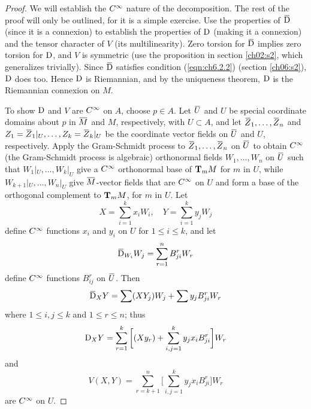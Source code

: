 \documentclass[../main]{subfiles}
\begin{document}
\begin{proof}
We will establish the $\CInfty$ nature of the decomposition. The rest of the proof will only be outlined, for it is a simple exercise. Use the properties of $\covariant$ (since it is a connexion) to establish the properties of $\D$ (making it a connexion) and the tensor character of $V$ (its multilinearity). Zero torsion for $\covariant$ implies zero torsion for $\D$, and $V$ is symmetric (use the proposition in section \ref{ch02:s2}, which generalizes trivially). Since $\covariant$ satisfies condition (\ref{eqn:ch6.2.2}) (section \ref{ch06:s2}), $\D$ does too. Hence $\D$ is Riemannian, and by the uniqueness theorem, $\D$ is the Riemannian connexion on $M$.

To show $\D$ and $V$ are $\CInfty$ on $A$, choose $p\in A$. Let $\xoverline U$ and $U$ be special coordinate domains about $p$ in $\xoverline M$ and $M$, respectively, with $U\subset A$, and let $\xoverline Z_1,\ldots,\xoverline Z_n$ and $Z_1=\xoverline Z_1|_U,\ldots,Z_k=\xoverline Z_k|_U$ be the coordinate vector fields on $\xoverline U$ and $U$, respectively. Apply the Gram-Schmidt process to $\xoverline Z_1,\ldots,\xoverline Z_n$ on $\xoverline U$ to obtain $\CInfty$ (the Gram-Schmidt process is algebraic) orthonormal fields $W_1,\ldots,W_n$ on $\xoverline U$ such that $W_1|_U,\ldots,W_k|_U$ give a $\CInfty$ orthonormal base of $\tangentspace{M}{m}$ for $m$ in $U$, while $W_{k+1}|_U,\ldots,W_n|_U$ give $\xoverline M$-vector fields that are $\CInfty$ on $U$ and form a base of the orthogonal complement to $\tangentspace{M}{m}$, for $m$ in $U$. Let
\[X = \sum_{i=1}^k x_iW_i,
\quad Y = \sum_{i=1}^k y_jW_j\]
define $\CInfty$ functions $x_i$ and $y_i$ on $U$ for $1\le i\le k$, and let
\[\covariant_{W_i}W_j = \sum_{r=1}^n B_{ji}^rW_r\]
define $\CInfty$ functions $B_{ij}^r$ on $\xoverline U$. Then
\[\covariant_XY = \sum(XY_j)W_j + \sum y_jB_{ji}^rW_r\]
where $1\le i,j\le k$ and $1\le r\le n$; thus
\[\D_XY = \sum_{r=1}^k\bigg[(Xy_r) + \sum_{i,j=1}^k y_jx_iB_{ji}^r\bigg]W_r\]
and
\[V(X,Y) = \sum_{r=k+1}^n\bigg[\sum_{i,j=1}^k y_jx_iB_{ji}^r\bigg]W_r\]
are $\CInfty$ on $U$.
\end{proof}
\end{document}
